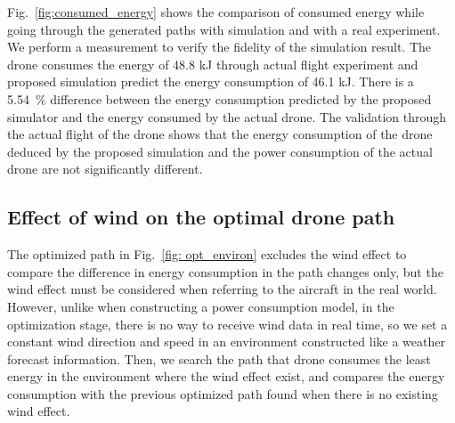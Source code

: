 \documentclass[journal]{./template/IEEEtran}
\begin{document}
Fig.~\ref{fig:consumed_energy} shows the comparison of consumed energy while going through the generated paths with simulation and with a real experiment. We perform a measurement to verify the fidelity of the simulation result.
The drone consumes the energy of 48.8 kJ through actual flight experiment and proposed simulation predict the energy consumption of 46.1 kJ.
There is a 5.54~\% difference between the energy consumption predicted by the proposed simulator and the energy consumed by the actual drone.
The validation through the actual flight of the drone shows that the energy consumption of the drone deduced by the proposed simulation and the power consumption of the actual drone are not significantly different.





\subsection{Effect of wind on the optimal drone path}

The optimized path in Fig.~\ref{fig: opt_environ} excludes the wind effect to compare the difference in energy consumption in the path changes only, but the wind effect must be considered when referring to the aircraft in the real world.
However, unlike when constructing a power consumption model, in the optimization stage, there is no way to receive wind data in real time, so we set a constant wind direction and speed in an environment constructed like a weather forecast information.
Then, we search the path that drone consumes the least energy in the environment where the wind effect exist, and compares the energy consumption with the previous optimized path found when there is no existing wind effect.
\end{document}
